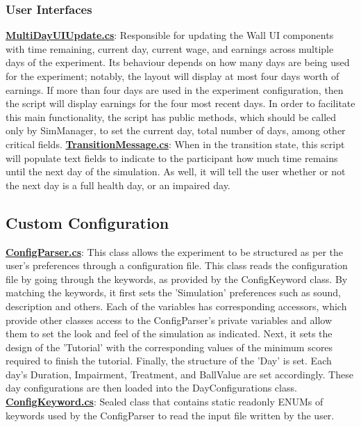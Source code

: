 \documentclass{article}
\begin{document}
\subsubsection{User Interfaces}
\href{https://bit.ly/2G9SRs1}{\textbf{MultiDayUIUpdate.cs}}: Responsible for updating the Wall UI components with time remaining, current day, current wage, and earnings across multiple days of the experiment. Its behaviour depends on how many days are being used for the experiment; notably, the layout will display at most four days worth of earnings. If more than four days are used in the experiment configuration, then the script will display earnings for the four most recent days. In order to facilitate this main functionality, the script has public methods, which should be called only by SimManager, to set the current day, total number of days, among other critical fields. \newline \newline
\href{https://bit.ly/2VHtW5B}{\textbf{TransitionMessage.cs}}: When in the transition state, this script will populate text fields to indicate to the participant how much time remains until the next day of the simulation. As well, it will tell the user whether or not the next day is a full health day, or an impaired day. \newline \newline


\subsection{Custom Configuration} 
\href{https://bit.ly/2TZaLYj}{\textbf{ConfigParser.cs}}: This class allows the experiment to be structured as per the user's preferences through a configuration file. This class reads the configuration file by going through the keywords, as provided by the ConfigKeyword class. By matching the keywords, it first sets the 'Simulation' preferences such as sound, description and others. Each of the variables has corresponding accessors, which provide other classes access to the ConfigParser's private variables and allow them to set the look and feel of the simulation as indicated. Next, it sets the design of the 'Tutorial' with the corresponding values of the minimum scores required to finish the tutorial. Finally, the structure of the 'Day' is set. Each day's Duration, Impairment, Treatment, and BallValue are set accordingly. These day configurations are then loaded into the DayConfigurations class.
\href{https://bit.ly/2TWgOwJ}{\textbf{ConfigKeyword.cs}}: Sealed class that contains static readonly ENUMs of keywords used by the ConfigParser to read the input file written by the user. 
\end{document}
